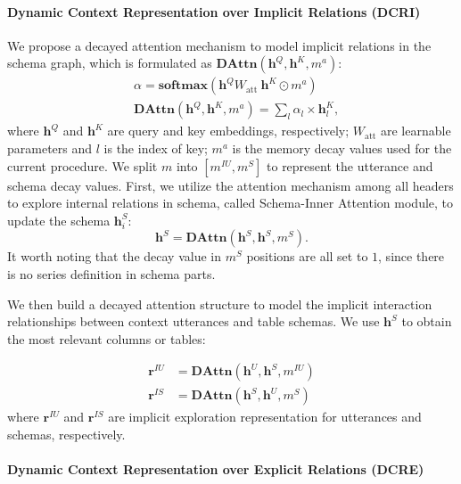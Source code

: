 \documentclass[letterpaper]{article} \usepackage{aaai21}  \usepackage{times}  \usepackage{helvet} \usepackage{courier}  \usepackage[hyphens]{url}  \usepackage{graphicx} \urlstyle{rm} \def\UrlFont{\rm}  \usepackage{natbib}  \usepackage{caption} \frenchspacing  \setlength{\pdfpagewidth}{8.5in}  \setlength{\pdfpageheight}{11in}
\begin{document}
\paragraph{Dynamic Context Representation over Implicit Relations (DCRI)}

We propose a decayed attention mechanism to model implicit relations in the schema graph, which is formulated as $\mathbf{DAttn}(\mathbf{h}^Q, \mathbf{h}^K, m^a)$:
\begin{equation}
\begin{aligned}
&\alpha =\mathbf{softmax}(\mathbf{h}^Q {W}_{\text {att }} \mathbf{h}^K \odot m^a) \\
&\mathbf{DAttn}(\mathbf{h}^Q, \mathbf{h}^K, m^a) =\sum_{l} \alpha_{l} \times \mathbf{h}^K_{l},
\end{aligned}
\end{equation}
where $\mathbf{h}^Q$ and $\mathbf{h}^K$ are query and key embeddings, respectively; ${W}_{\text{att}}$ are learnable parameters and $l$ is the index of key; $m^a$ is the memory decay values used for the current procedure. We split $m$ into $[m^{IU}, m^S]$ to represent the utterance and schema decay values.
First, we utilize the attention mechanism among all headers to explore internal relations in schema, called Schema-Inner Attention module, to update the schema  $\mathbf{h}_{i}^{S}$:
\begin{equation}
\label{inner-att}
\mathbf{h}^{S} = \mathbf{DAttn}(\mathbf{h}^{S}, \mathbf{h}^{S}, m^S).
\end{equation}
It worth noting that the decay value in $m^S$ positions are all set to $1$, since there is no series definition in schema parts.

We then build a decayed attention structure to model the implicit interaction relationships between context utterances and table schemas. We use  $\mathbf{h}^{S}$ to obtain the most relevant columns or tables:

\begin{equation}
\label{co-att}
\begin{aligned}
\mathbf{r}^{IU} &= \mathbf{DAttn}(\mathbf{h}^{U}, \mathbf{h}^{S}, m^{IU}) \\
\mathbf{r}^{IS} &= \mathbf{DAttn}(\mathbf{h}^{S}, \mathbf{h}^{U}, m^{S})
\end{aligned}
\end{equation}
where $\mathbf{r}^{IU}$ and $\mathbf{r}^{IS}$ are implicit exploration representation for utterances and schemas, respectively.

\paragraph{Dynamic Context Representation over Explicit Relations (DCRE)}
\end{document}
